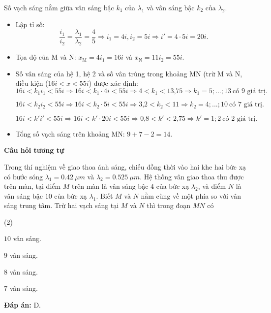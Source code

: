 \begin{dang}{Số vạch sáng nằm giữa vân sáng bậc $k_1$ của $\lambda_1$ và vân sáng bậc $k_2$ của $\lambda_2$.}
{\begin{itemize}
	\item Lập tỉ số: 
	\begin{equation*}
		\dfrac{i_1}{i_2}=\dfrac{\lambda_1}{\lambda_2}=\dfrac{4}{5} \Rightarrow i_1=4i, i_2=5i \Rightarrow i'=4\cdot 5i=20i.
	\end{equation*}
	\item Tọa độ của M và N: $x_{\text{M}}=4i_1=16i$ và $x_{\text{N}}=11i_2=55i$.
	\item Số vân sáng của hệ 1, hệ 2 và số vân trùng trong khoảng MN (trừ M và N, điều kiện ($16i < x < 55i$) được xác định: 
	\begin{equation*}
	16i < k_1i_1  < 55i \Rightarrow 16i<k_1\cdot 4i<55i \Rightarrow 4<k_1< \text{13,75} \Rightarrow k_1=5;...;13\ \text {có 9 giá trị}.
	\end{equation*}

	\begin{equation*}
	16i < k_2i_2  < 55i \Rightarrow 16i<k_2\cdot 5i<55i \Rightarrow \text{3,2}<k_2< 11 \Rightarrow k_2=4;...;10\ \text {có 7 giá trị}.
	\end{equation*}

	\begin{equation*}
	16i < k'i'  < 55i \Rightarrow 16i<k'\cdot 20i<55i \Rightarrow \text{0,8}<k'< \text{2,75} \Rightarrow k'=1; 2\ \text {có 2 giá trị}.
	\end{equation*}

	\item Tổng số vạch sáng trên khoảng MN: $9+7-2=14$.  
\end{itemize}

		\begin{center}
			\textbf{Câu hỏi tương tự}
		\end{center}
Trong thí nghiệm về giao thoa ánh sáng, chiếu đồng thời vào hai khe hai bức xạ có bước sóng $ \lambda_{1} = \SI{0,42}{\mu m} $ và $ \lambda_{2} = \SI{0,525}{\mu m} $. Hệ thống vân giao thoa thu được trên màn, tại điểm $ M $ trên màn là vân sáng bậc $ 4 $ của bức xạ $ \lambda_{2} $, và điểm $ N $ là vân sáng bậc $ 10 $ của bức xạ $ \lambda_{1} $. Biết $ M $ và $ N $ nằm cùng về một phía so với vân sáng trung tâm. Trừ hai vạch sáng tại $ M $ và $ N $ thì trong đoạn $ MN $ có
\begin{mcq}(2)
	\item $ 10 $ vân sáng.
	\item $ 9 $ vân sáng.
	\item $ 8 $ vân sáng.
	\item $ 7 $ vân sáng.
\end{mcq}
\textbf{Đáp án:} D.
}


\end{dang}
